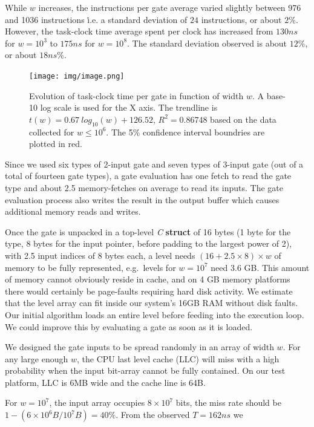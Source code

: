 \par
While $w$ increases, the instructions per gate average varied slightly between 976 and 1036
instructions \.i.e. a standard deviation of $24$ instructions, or about $2\%$. However,
the task-clock time average spent per clock has increased from $130ns$ for $w=10^3$
to $175ns$ for $w=10^8$. The standard deviation observed is about $12\%$, or about $18ns\%$.
\begin{figure}[h!]
	\center
	\texttt{[image: img/image.png]}
	\caption[width=0.48\textwidth]{Evolution of task-clock time per gate in function
	of width $w$. A base-10 log scale is used for the X axis.
	The trendline is $t(w) = 0.67\ log_{10}(w) + 126.52$, $R^2 = 0.86748$ based on the
	data collected for $w \leq 10^6$.
	The 5\% confidence interval boundries are plotted in red.
}
	\label{fig:level}
\end{figure}
\par
Since we used six types of 2-input gate and seven types of 3-input gate (out of
a total of fourteen gate types), a gate evaluation has one fetch to read the gate
type and about 2.5 memory-fetches on average to read its inputs. The gate
evaluation process also writes the result in the output buffer which causes
additional memory reads and writes.
\par
Once the gate is unpacked in a top-level \textit{C} \textbf{struct} of 16 bytes
(1 byte for the type, 8 bytes for the input pointer, before padding to the largest
power of 2), with 2.5 input indices of 8 bytes each, a level needs
$ (16 + 2.5 \times 8) \times w $ of memory to be fully represented, e.g.\ levels
for $w = 10^7$ need 3.6 GB. This amount of memory cannot obviously reside in cache,
and on 4 GB memory platforms there would certainly be page-faults requiring hard
disk activity. We estimate that the level array can fit inside our system's 16GB
RAM without disk faults. Our initial algorithm loads an entire level before
feeding into the execution loop. We could improve this by evaluating a gate as
soon as it is loaded.
\par
We designed the gate inputs to be spread randomly in an array of width $w$. For
any large enough $w$, the CPU last level cache (LLC) will miss with a high
probability when the input bit-array cannot be fully contained. On our test
platform, LLC is 6MB wide and the cache line is 64B\cite{agner}.
\par
For $w = 10^7$, the input array occupies $8 \times 10^7$ bits, the miss rate
should be $1 - (6\times10^6B/10^7B) = 40\%$. From the observed $T = 162ns$ we
